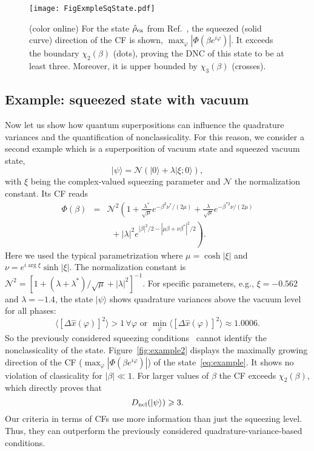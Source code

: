 \documentclass[aps,pra,twocolumn,showpacs,superscriptaddress,10pt]{revtex4-1}
\begin{document}
\begin{figure}[ht]
	\texttt{[image: FigExmpleSqState.pdf]}
	\caption{(color online)
		For the state $\hat{\rho}_{\rm ex}$ from Ref.~\cite{Ryl2015}, the squeezed (solid curve) direction of the CF is shown, $\max_\varphi |\Phi(\beta e^{i\varphi})|$.
		It exceeds the boundary $\chi_2(\beta)$ (dots), proving the DNC of this state to be at least three.
		Moreover, it is upper bounded by $\chi_3(\beta)$ (crosses).
		}\label{fig:example1}
\end{figure}

\subsection{Example: squeezed state with vacuum}
	Now let us show how quantum superpositions can influence the quadrature variances and the quantification of nonclassicality.
	For this reason, we consider a second example which is a superposition of vacuum state and squeezed vacuum state,
	\begin{equation}
		|\psi\rangle=\mathcal{N}(|0\rangle+\lambda|\xi;0\rangle),\label{eq:example}
	\end{equation}
	with $\xi$ being the complex-valued squeezing parameter and $\mathcal{N}$ the normalization constant.
	Its CF reads
	\begin{eqnarray}
		\Phi(\beta)
		&=&\mathcal{N}^2\left(1+\frac{\lambda^{\ast}}{\sqrt{\mu}} e^{-\beta^{2}\nu^{\ast}/(2\mu)}+\frac{\lambda}{\sqrt{\mu}}e^{-\beta^{\ast 2}\nu/(2\mu)}\right.\nonumber\\
		&&\left.\phantom{\frac{0}{1}}+|\lambda|^2e^{|\beta|^2/2-|\mu\beta+\nu\beta^{\ast}|^2/2}\right).
	\end{eqnarray}
	Here we used the typical parametrization where $\mu=\cosh|\xi|$ and $\nu=e^{i\arg\xi}\sinh|\xi|$.
	The normalization constant is $\mathcal{N}^2=[1+(\lambda+\lambda^{\ast})/\sqrt{\mu}+|\lambda|^2]^{-1}$.
	For specific parameters, e.g., $\xi=-0.562$ and $\lambda=-1.4$, the state $|\psi\rangle$ shows quadrature variances above the vacuum level for all phases:
	\begin{equation}
		\langle[\Delta \hat{x}(\varphi)]^2\rangle>1\,\forall\varphi
		\text{ or }
		\min\limits_{\varphi}\langle[\Delta \hat{x}(\varphi)]^2\rangle\approx1.0006. \label{eq:example_prop}
	\end{equation}
	So the previously considered squeezing conditions~\cite{Mraz2014} cannot identify the nonclassicality of the state.
	Figure~\ref{fig:example2} displays the maximally growing direction of the CF ($\max_\varphi |\Phi(\beta e^{i\varphi})|$) of the state~\eqref{eq:example}.
	It shows no violation of classicality  for $|\beta|{\ll}1$.
	For larger values of $\beta$ the CF exceeds $\chi_2(\beta)$, which directly proves that
	\begin{equation}
		D_{\rm ncl}(|\psi\rangle)\geqslant 3.
	\end{equation}
	Our criteria in terms of CFs use more information than just the squeezing level.
	Thus, they can outperform the previously considered quadrature-variance-based conditions.
\end{document}
